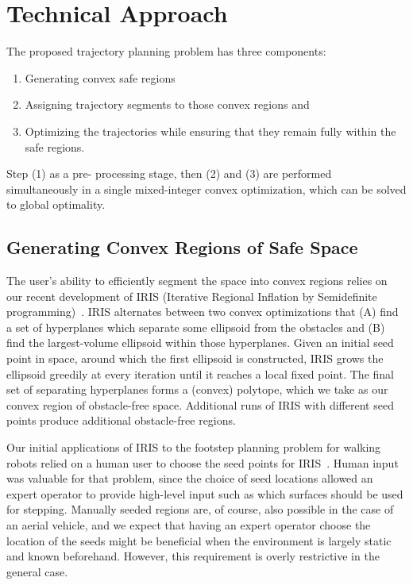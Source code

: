 \chapter{Technical Approach}

The proposed trajectory planning problem has three
components:\begin{enumerate}
	\item Generating convex safe regions
	\item Assigning trajectory segments to those convex regions and
	\item Optimizing the trajectories while ensuring that they remain
	fully within the safe regions.
\end{enumerate} Step (1) as a pre-
processing stage, then (2) and (3) are performed simultaneously in
a single mixed-integer convex optimization, which can be
solved to global optimality.

\section{Generating Convex Regions of Safe Space}

The user's ability to efficiently segment the space into convex
regions relies on our recent development of IRIS (Iterative
Regional Inflation by Semidefinite programming)~\cite{deits2015computing}. IRIS
alternates between two convex optimizations that (A) find a
set of hyperplanes which separate some ellipsoid from the
obstacles and (B) find the largest-volume ellipsoid within
those hyperplanes. Given an initial seed point in space,
around which the first ellipsoid is constructed, IRIS grows
the ellipsoid greedily at every iteration until it reaches a local
fixed point. The final set of separating hyperplanes forms a
(convex) polytope, which we take as our convex region of
obstacle-free space. Additional runs of IRIS with different
seed points produce additional obstacle-free regions.

Our initial applications of IRIS to the footstep planning
problem for walking robots relied on a human user to
choose the seed points for IRIS~\cite{deits2014footstep}. Human input was
valuable for that problem, since the choice of seed locations
allowed an expert operator to provide high-level input such
as which surfaces should be used for stepping. Manually
seeded regions are, of course, also possible in the case of an
aerial vehicle, and we expect that having an expert operator
choose the location of the seeds might be beneficial when
the environment is largely static and known beforehand.
However, this requirement is overly restrictive in the general
case.

